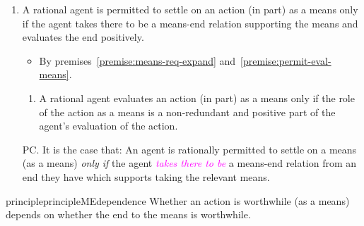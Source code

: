 \documentclass[10pt]{article}
\newcommand{\hozlinedash}[0]{%
  \noindent\hdashrule[0.5ex][c]{\textwidth}{.1pt}{2.5pt}
}
\begin{document}
\begin{enumerate}[label=P\arabic*., ref=(P\arabic*), resume]
\item A rational agent is permitted to settle on an action (in part) as a means only if the agent takes there to be a means-end relation supporting the means and evaluates the end positively.
  \begin{itemize}
  \item By premises~\ref{premise:means-req-expand} and~\ref{premise:permit-eval-means}.
  \end{itemize}
  \begin{enumerate}[label=P\arabic{enumi}\alph*., ref=(P\arabic{enumi}\alph*)]
  \item\label{premise:means-req-expand} A rational agent evaluates an action (in part) as a means only if the role of the action as a means is a non-redundant and positive part of the agent’s evaluation of the action.
  \end{enumerate}
\end{enumerate}

\begin{enumerate}[label=P\arabic*., ref=(P\arabic*), resume]
\item[PC.] It is the case that:
  An agent is rationally permitted to settle on a means (as a means)  \emph{only if} the agent \textcolor{fuchsia}{\emph{takes there to be}} a means-end relation from an end they have which supports taking the relevant means.
\end{enumerate}

\begin{restatable}{principle}{principleMEdependence}\label{principle:dependence}
  Whether an action is worthwhile (as a means) depends on whether the end to the means is worthwhile.
\end{restatable}

\newpage

\end{document}

